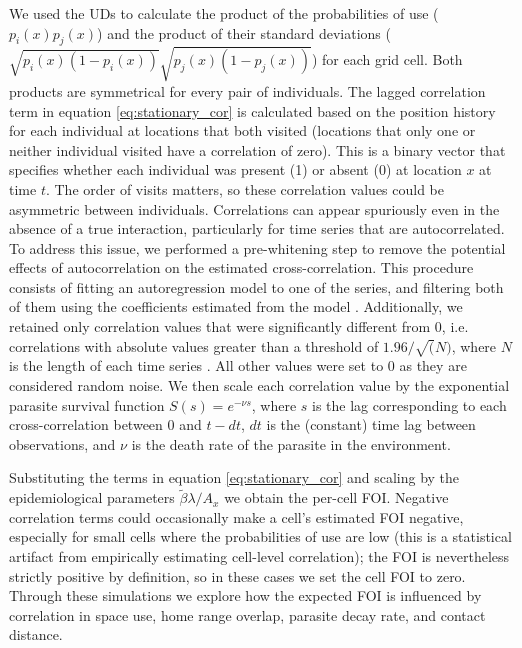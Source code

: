 \documentclass[letterpaper]{article}
\begin{document}
We used the UDs to calculate the product of the probabilities of use ($p_i(x)p_j(x)$) and the product of their standard deviations ($\sqrt{p_i(x)(1-p_i(x))}\sqrt{p_j(x)(1-p_j(x))}$) for each grid cell. Both products are symmetrical for every pair of individuals. 
The lagged correlation term in equation \ref{eq:stationary_cor} is calculated based on the position history for each individual at locations that both visited (locations that only one or neither individual visited have a correlation of zero). This is a binary vector that specifies whether each individual was present (1) or absent (0) at location $x$ at time $t$. 
The order of visits matters, so these correlation values could be asymmetric between individuals. 
Correlations can appear spuriously even in the absence of a true interaction, particularly for time series that are autocorrelated. To address this issue, we performed a pre-whitening step to remove the potential effects of autocorrelation on the estimated cross-correlation. This procedure consists of fitting an autoregression model to one of the series, and filtering both of them using the coefficients estimated from the model \citep{Dean2016}. Additionally, we retained only correlation values that were significantly different from 0, i.e. correlations with absolute values greater than a threshold of $1.96/\sqrt(N)$, where $N$ is the length of each time series \citep{Dean2016}. All other values were set to 0 as they are considered random noise.
We then scale each correlation value by the exponential parasite survival function $S(s) = e^{-\nu s}$, where $s$ is the lag corresponding to each cross-correlation between 0 and $t-dt$, $dt$ is the (constant) time lag between observations, and $\nu$ is the death rate of the parasite in the environment. 

Substituting the terms in equation \ref{eq:stationary_cor} and scaling by the epidemiological parameters $\tilde\beta\lambda/ A_x$ we obtain the per-cell FOI. Negative correlation terms could occasionally make a cell's estimated FOI negative, especially for small cells where the probabilities of use are low (this is a statistical artifact from empirically estimating cell-level correlation); the FOI is nevertheless strictly positive by definition, so in these cases we set the cell FOI to zero.
Through these simulations we explore how the expected FOI is influenced by correlation in space use, home range overlap, parasite decay rate, and contact distance. %
\end{document}
